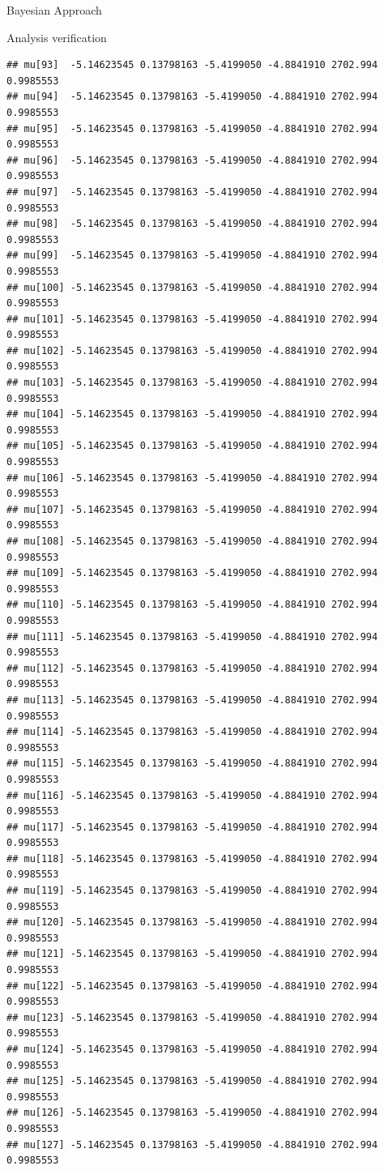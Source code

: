 \documentclass[
  ignorenonframetext,
]{beamer}
\begin{document}
\begin{frame}[fragile]{Bayesian Approach}
\begin{block}{Analysis verification}
\begin{verbatim}
## mu[93]  -5.14623545 0.13798163 -5.4199050 -4.8841910 2702.994 0.9985553
## mu[94]  -5.14623545 0.13798163 -5.4199050 -4.8841910 2702.994 0.9985553
## mu[95]  -5.14623545 0.13798163 -5.4199050 -4.8841910 2702.994 0.9985553
## mu[96]  -5.14623545 0.13798163 -5.4199050 -4.8841910 2702.994 0.9985553
## mu[97]  -5.14623545 0.13798163 -5.4199050 -4.8841910 2702.994 0.9985553
## mu[98]  -5.14623545 0.13798163 -5.4199050 -4.8841910 2702.994 0.9985553
## mu[99]  -5.14623545 0.13798163 -5.4199050 -4.8841910 2702.994 0.9985553
## mu[100] -5.14623545 0.13798163 -5.4199050 -4.8841910 2702.994 0.9985553
## mu[101] -5.14623545 0.13798163 -5.4199050 -4.8841910 2702.994 0.9985553
## mu[102] -5.14623545 0.13798163 -5.4199050 -4.8841910 2702.994 0.9985553
## mu[103] -5.14623545 0.13798163 -5.4199050 -4.8841910 2702.994 0.9985553
## mu[104] -5.14623545 0.13798163 -5.4199050 -4.8841910 2702.994 0.9985553
## mu[105] -5.14623545 0.13798163 -5.4199050 -4.8841910 2702.994 0.9985553
## mu[106] -5.14623545 0.13798163 -5.4199050 -4.8841910 2702.994 0.9985553
## mu[107] -5.14623545 0.13798163 -5.4199050 -4.8841910 2702.994 0.9985553
## mu[108] -5.14623545 0.13798163 -5.4199050 -4.8841910 2702.994 0.9985553
## mu[109] -5.14623545 0.13798163 -5.4199050 -4.8841910 2702.994 0.9985553
## mu[110] -5.14623545 0.13798163 -5.4199050 -4.8841910 2702.994 0.9985553
## mu[111] -5.14623545 0.13798163 -5.4199050 -4.8841910 2702.994 0.9985553
## mu[112] -5.14623545 0.13798163 -5.4199050 -4.8841910 2702.994 0.9985553
## mu[113] -5.14623545 0.13798163 -5.4199050 -4.8841910 2702.994 0.9985553
## mu[114] -5.14623545 0.13798163 -5.4199050 -4.8841910 2702.994 0.9985553
## mu[115] -5.14623545 0.13798163 -5.4199050 -4.8841910 2702.994 0.9985553
## mu[116] -5.14623545 0.13798163 -5.4199050 -4.8841910 2702.994 0.9985553
## mu[117] -5.14623545 0.13798163 -5.4199050 -4.8841910 2702.994 0.9985553
## mu[118] -5.14623545 0.13798163 -5.4199050 -4.8841910 2702.994 0.9985553
## mu[119] -5.14623545 0.13798163 -5.4199050 -4.8841910 2702.994 0.9985553
## mu[120] -5.14623545 0.13798163 -5.4199050 -4.8841910 2702.994 0.9985553
## mu[121] -5.14623545 0.13798163 -5.4199050 -4.8841910 2702.994 0.9985553
## mu[122] -5.14623545 0.13798163 -5.4199050 -4.8841910 2702.994 0.9985553
## mu[123] -5.14623545 0.13798163 -5.4199050 -4.8841910 2702.994 0.9985553
## mu[124] -5.14623545 0.13798163 -5.4199050 -4.8841910 2702.994 0.9985553
## mu[125] -5.14623545 0.13798163 -5.4199050 -4.8841910 2702.994 0.9985553
## mu[126] -5.14623545 0.13798163 -5.4199050 -4.8841910 2702.994 0.9985553
## mu[127] -5.14623545 0.13798163 -5.4199050 -4.8841910 2702.994 0.9985553

\end{verbatim}
\end{block}
\end{frame}
\end{document}
